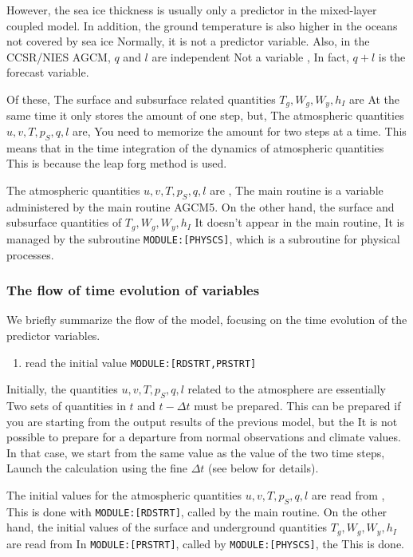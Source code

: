 However, the sea ice thickness is usually only a predictor in the
mixed-layer coupled model. In addition, the ground temperature is also
higher in the oceans not covered by sea ice Normally, it is not a
predictor variable. Also, in the CCSR/NIES AGCM, \(q\) and \(l\) are
independent Not a variable , In fact, \(q+l\) is the forecast variable.

Of these, The surface and subsurface related quantities
\(T_g, W_g, W_y, h_I\) are At the same time it only stores the amount of
one step, but, The atmospheric quantities \(u, v, T, p_S, q, l\) are,
You need to memorize the amount for two steps at a time. This means that
in the time integration of the dynamics of atmospheric quantities This
is because the leap forg method is used.

The atmospheric quantities \(u, v, T, p_S, q, l\) are , The main routine
is a variable administered by the main routine AGCM5. On the other hand,
the surface and subsurface quantities of \(T_g, W_g, W_y, h_I\) It
doesn't appear in the main routine, It is managed by the subroutine
\texttt{MODULE:{[}PHYSCS{]}}, which is a subroutine for physical
processes.

\hypertarget{the-flow-of-time-evolution-of-variables}{%
\subsubsection{The flow of time evolution of
variables}\label{the-flow-of-time-evolution-of-variables}}

We briefly summarize the flow of the model, focusing on the time
evolution of the predictor variables.

\begin{enumerate}
\def\labelenumi{\arabic{enumi}.}
\tightlist
\item
  read the initial value \texttt{MODULE:{[}RDSTRT,PRSTRT{]}}
\end{enumerate}

Initially, the quantities \(u, v, T, p_S, q, l\) related to the
atmosphere are essentially Two sets of quantities in \(t\) and
\(t-\Delta t\) must be prepared. This can be prepared if you are
starting from the output results of the previous model, but the It is
not possible to prepare for a departure from normal observations and
climate values. In that case, we start from the same value as the value
of the two time steps, Launch the calculation using the fine
\(\Delta t\) (see below for details).

The initial values for the atmospheric quantities \(u, v, T, p_S, q, l\)
are read from , This is done with \texttt{MODULE:{[}RDSTRT{]}}, called
by the main routine. On the other hand, the initial values of the
surface and underground quantities \(T_g, W_g, W_y, h_I\) are read from
In \texttt{MODULE:{[}PRSTRT{]}}, called by \texttt{MODULE:{[}PHYSCS{]}},
the This is done.

